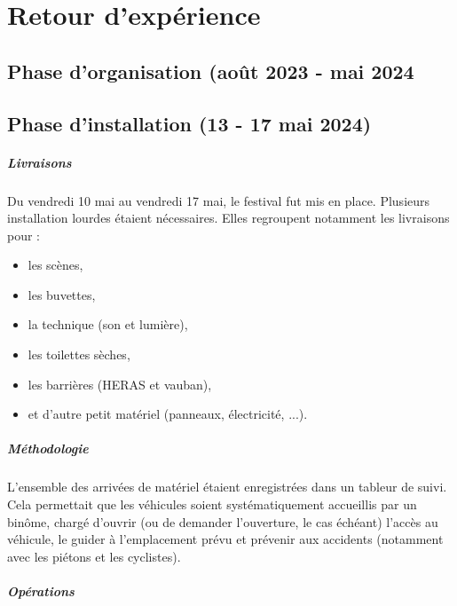 \documentclass[12pt,a4paper]{report}
\begin{document}
\chapter{Retour d'expérience}

\section{Phase d'organisation (août 2023 - mai 2024}



\section{Phase d'installation (13 - 17 mai 2024)}

\paragraph{Livraisons}
Du vendredi 10 mai au vendredi 17 mai, le festival fut mis en place. Plusieurs installation lourdes étaient nécessaires. Elles regroupent notamment les livraisons pour : 
\begin{itemize}
\item les scènes,
\item les buvettes,
\item la technique (son et lumière),
\item les toilettes sèches, 
\item les barrières (HERAS et vauban),
\item et d'autre petit matériel (panneaux, électricité, ...).
\end{itemize}

\paragraph{Méthodologie}
L'ensemble des arrivées de matériel étaient enregistrées dans un tableur de suivi. Cela permettait que les véhicules soient systématiquement accueillis par un binôme, chargé d'ouvrir (ou de demander l'ouverture, le cas échéant) l'accès au véhicule, le guider à l'emplacement prévu et prévenir aux accidents (notamment avec les piétons et les cyclistes).

\paragraph{Opérations}
\end{document}
